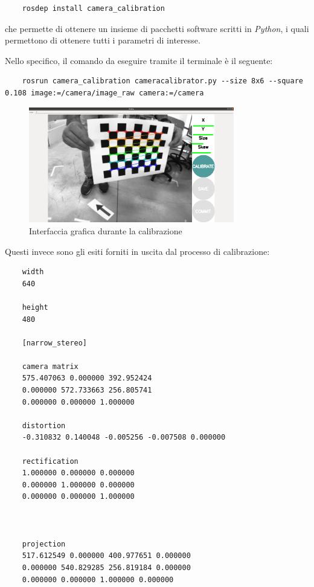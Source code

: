 \begin{lstlisting}
	rosdep install camera_calibration
\end{lstlisting}

che permette di ottenere un insieme di pacchetti software scritti in \textit{Python}, i quali permettono di ottenere tutti i parametri di interesse.

Nello specifico, il comando da eseguire tramite il terminale è il seguente:

\begin{lstlisting}
	rosrun camera_calibration cameracalibrator.py --size 8x6 --square 0.108 image:=/camera/image_raw camera:=/camera
\end{lstlisting}

\begin{figure}[H]
	\centering
	\includegraphics[width=0.8\textwidth]{Immagini/Calibration.png}
	\caption{Interfaccia grafica durante la calibrazione}
	\label{fig:calibrationInterface}
\end{figure}

Questi invece sono gli esiti forniti in uscita dal processo di calibrazione:

\begin{lstlisting}
	width
	640
	
	height
	480
	
	[narrow_stereo]
	
	camera matrix
	575.407063 0.000000 392.952424
	0.000000 572.733663 256.805741
	0.000000 0.000000 1.000000
	
	distortion
	-0.310832 0.140048 -0.005256 -0.007508 0.000000
	
	rectification
	1.000000 0.000000 0.000000
	0.000000 1.000000 0.000000
	0.000000 0.000000 1.000000
	
	
	
	projection
	517.612549 0.000000 400.977651 0.000000
	0.000000 540.829285 256.819184 0.000000
	0.000000 0.000000 1.000000 0.000000
\end{lstlisting}


